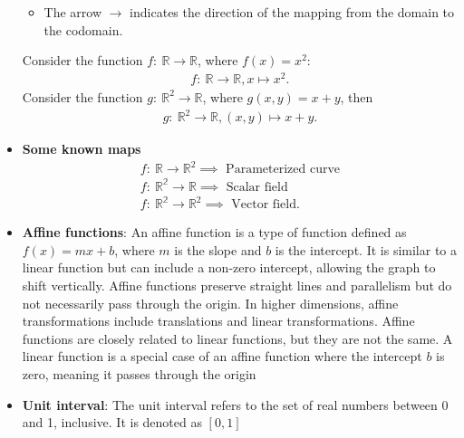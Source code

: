 \documentclass{report}
\begin{document}
\begin{itemize}
\begin{itemize}
                \item The arrow $\to$ indicates the direction of the mapping from the domain to the codomain.
            \end{itemize}
            \bigbreak \noindent 
            Consider the function $f:\ \mathbb{R}  \to \mathbb{R}$, where $f(x) = x^{2}$:
            \begin{align*}
                f:\ \mathbb{R} \to \mathbb{R}, x \mapsto x^{2}
            .\end{align*}
            \bigbreak \noindent 
            Consider the function $g:\ \mathbb{R}^{2} \to \mathbb{R}$, where $g(x,y) = x + y$, then 
            \begin{align*}
               g:\ \mathbb{R}^{2} \to \mathbb{R}, (x,y) \mapsto x + y  
            .\end{align*}
        \item \textbf{Some known maps}
            \begin{align*}
                f:\ \mathbb{R} \to \mathbb{R}^{2} \implies \text{ Parameterized curve}  \\
                f:\ \mathbb{R^{2}} \to \mathbb{R} \implies \text{ Scalar field}  \\
                f:\ \mathbb{R^{2}} \to \mathbb{R}^{2} \implies \text{ Vector field} 
            .\end{align*}
        \item \textbf{Affine functions}:
            An affine function is a type of function defined as $f(x)=mx+b$, where $m$ is the slope and $b$ is the intercept. It is similar to a linear function but can include a non-zero intercept, allowing the graph to shift vertically. Affine functions preserve straight lines and parallelism but do not necessarily pass through the origin. In higher dimensions, affine transformations include translations and linear transformations.
            \bigbreak \noindent 
            Affine functions are closely related to linear functions, but they are not the same. A linear function is a special case of an affine function where the intercept $b$ is zero, meaning it passes through the origin
        \item \textbf{Unit interval}: The unit interval refers to the set of real numbers between 0 and 1, inclusive. It is denoted as $[0,1]$

    \end{itemize}

    \pagebreak 
\end{document}
